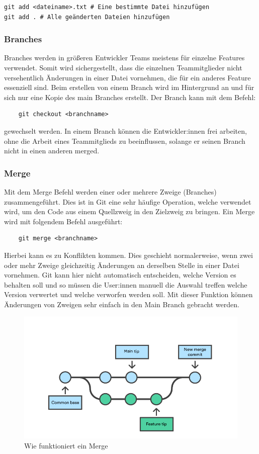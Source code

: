 \begin{verbatim}
git add <dateiname>.txt # Eine bestimmte Datei hinzufügen
git add . # Alle geänderten Dateien hinzufügen
\end{verbatim}

\subsubsection{Branches}

Branches werden in größeren Entwickler Teams meistens für einzelne Features verwendet. Somit wird sichergestellt, dass die einzelnen Teammitglieder nicht versehentlich Änderungen in einer Datei vornehmen, die für ein anderes Feature essenziell sind. Beim erstellen von einem Branch wird im Hintergrund an und für sich nur eine Kopie des main Branches erstellt. Der Branch kann mit dem Befehl: 

\begin{verbatim}
    git checkout <branchname>
\end{verbatim}

gewechselt werden.
In einem Branch können die Entwickler:innen frei arbeiten, ohne die Arbeit eines Teammitglieds zu beeinflussen, solange er seinen Branch nicht in einen anderen merged.
\cite{Github_Branches}

\subsubsection{Merge}

Mit dem Merge Befehl werden einer oder mehrere Zweige (Branches) zusammengeführt. Dies ist in Git eine sehr häufige Operation, welche verwendet wird, um den Code aus einem Quellzweig in den Zielzweig zu bringen.
Ein Merge wird mit folgendem Befehl ausgeführt: 

\begin{verbatim}
    git merge <branchname>
\end{verbatim}

Hierbei kann es zu Konflikten kommen. Dies geschieht normalerweise, wenn zwei oder mehr Zweige gleichzeitig Änderungen an derselben Stelle in einer Datei vornehmen. Git kann hier nicht automatisch entscheiden, welche Version es behalten soll und so müssen die User:innen manuell die Auswahl treffen welche Version verwertet und welche verworfen werden soll. Mit dieser Funktion können Änderungen von Zweigen sehr einfach in den Main Branch gebracht werden.

\begin{figure}[h!]
    \centering
    \includegraphics[width=0.6\linewidth]{pics/merge.png}
    \caption{Wie funktioniert ein Merge}
    \label{fig:enter-label}
\end{figure}


